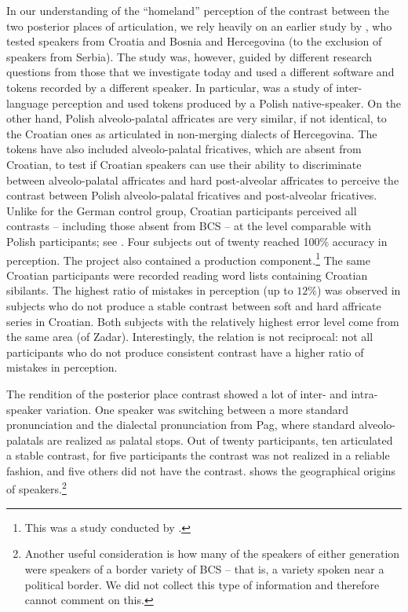 \documentclass[output=paper,
modfonts,
newtxmath,
hidelinks,
]{langscibook}
\begin{document}
In our understanding of the “homeland” perception of the contrast between the two posterior places of articulation, we rely heavily on an earlier study by \citet{Cavar-Hamann2011}, who test{ed} speakers from Croatia and Bosnia and Hercegovina (to the exclusion of speakers from Serbia). The study was, however, guided by different research questions from those that we investigate today and used a different software and tokens recorded by a different speaker. In particular, \citet{Cavar-Hamann2011} was a study of inter-language perception and used tokens produced by a Polish native-speaker. On the other hand, Polish alveolo-palatal affricates are very similar, if not identical, to the Croatian ones as articulated in non-merging dialects of Hercegovina. The tokens have also included alveolo-palatal fricatives, which are absent from Croatian, to test if Croatian speakers can use their ability to discriminate between alveolo-palatal affricates and hard post-alveolar affricates to perceive the contrast between Polish alveolo-palatal fricatives and post-alveolar fricatives. Unlike for the German control group, Croatian participants perceived all contrasts – including those absent from BCS – at the level comparable with Polish participants; see . Four subjects out of twenty reached 100\% accuracy in perception. The project also contained a production component.\footnote{This was a study conducted by \citet{Cavar-Hamann2008}.} The same Croatian participants were recorded reading word lists containing Croatian sibilants. The highest ratio of mistakes in perception (up to $12\%$) was observed in subjects who do not produce a stable contrast between soft and hard affricate series in Croatian. Both subjects with the relatively highest error level come from the same area (of Zadar). Interestingly, the relation is not reciprocal: not all participants who do not produce consistent contrast have a higher ratio of mistakes in perception.

The rendition of the posterior place contrast showed a lot of inter- and intra-speaker variation. One speaker was switching between a more standard pronunciation and the dialectal pronunciation from Pag, where standard alveolo-palatals are realized as palatal stops. Out of twenty participants, ten articulated a stable contrast, for five participants the contrast was not realized in a reliable fashion, and five others did not have the contrast.  shows the geographical origins of speakers.\footnote{Another useful consideration is how many of the speakers of either generation were speakers of a border variety of BCS – that is, a variety spoken near a political border. We did not collect this type of information and therefore cannot comment on this.}
\end{document}
